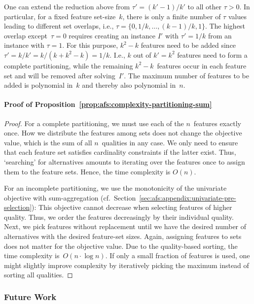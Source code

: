 \documentclass{article}
\theoremstyle{definition}
\begin{document}
One can extend the reduction above from $\tau' = (k' - 1) / k'$ to all other $\tau > 0$.
In particular, for a fixed feature set-size~$k$, there is only a finite number of $\tau$ values leading to different set overlaps, i.e., $\tau = \{0, 1/k, \dots, (k - 1) / k, 1\}$.
The highest overlap except~$\tau=0$ requires creating an instance $I'$ with $\tau'= 1/k$ from an instance with $\tau = 1$.
For this purpose, $k^2 - k$ features need to be added since $\tau' = k / k' = k / (k + k^2 -k) = 1/k$.
I.e., $k$ out of $k' = k^2$ features need to form a complete partitioning, while the remaining $k^2 - k$~features occur in each feature set and will be removed after solving~$I'$.
The maximum number of features to be added is polynomial in~$k$ and thereby also polynomial in~$n$.

\paragraph{Proof of Proposition~\ref{prop:afs:complexity-partitioning-sum}}
%
\begin{proof}
For a complete partitioning, we must use each of the $n$~features exactly once.
How we distribute the features among sets does not change the objective value, which is the sum of all $n$~qualities in any case.
We only need to ensure that each feature set satisfies cardinality constraints if the latter exist.
Thus, `searching' for alternatives amounts to iterating over the features once to assign them to the feature sets.
Hence, the time complexity is $O(n)$.

For an incomplete partitioning, we use the monotonicity of the univariate objective with sum-aggregation (cf.~Section~\ref{sec:afs:appendix:univariate-pre-selection}):
This objective cannot decrease when selecting features of higher quality.
Thus, we order the features decreasingly by their individual quality.
Next, we pick features without replacement until we have the desired number of alternatives with the desired feature-set sizes.
Again, assigning features to sets does not matter for the objective value.
Due to the quality-based sorting, the time complexity is~$O(n \cdot \log n)$.
If only a small fraction of features is used, one might slightly improve complexity by iteratively picking the maximum instead of sorting all qualities.
\end{proof}

\subsubsection{Future Work}
\label{sec:afs:appendix:complexity:future-work}
\end{document}
